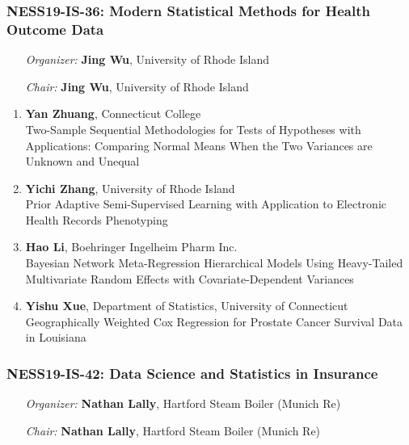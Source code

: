 \subsubsection*{NESS19-IS-36: Modern Statistical Methods for Health Outcome Data}

\begin{enumerate}[align=left]
\item [\emph{Organizer:}] \textbf{Jing Wu}, University of Rhode Island \\
\item [\emph{Chair:}] \textbf{Jing Wu}, University of Rhode Island
\end{enumerate}

\begin{enumerate}
\item \textbf{Yan Zhuang}, Connecticut College \\
Two-Sample Sequential Methodologies for Tests of Hypotheses with Applications: Comparing Normal Means When the Two Variances are Unknown and Unequal
\item \textbf{Yichi Zhang}, University of Rhode Island \\
Prior Adaptive Semi-Supervised Learning with Application to Electronic Health Records Phenotyping
\item \textbf{Hao Li}, Boehringer Ingelheim Pharm Inc. \\
Bayesian Network Meta-Regression Hierarchical Models Using Heavy-Tailed Multivariate Random Effects with Covariate-Dependent Variances
\item \textbf{Yishu Xue}, Department of Statistics, University of Connecticut \\
Geographically Weighted Cox Regression for Prostate Cancer Survival Data in Louisiana
\end{enumerate}

\subsubsection*{NESS19-IS-42: Data Science and Statistics in Insurance}

\begin{enumerate}[align=left]
\item [\emph{Organizer:}] \textbf{Nathan Lally}, Hartford Steam Boiler (Munich Re) \\
\item [\emph{Chair:}] \textbf{Nathan Lally}, Hartford Steam Boiler (Munich Re)
\end{enumerate}

